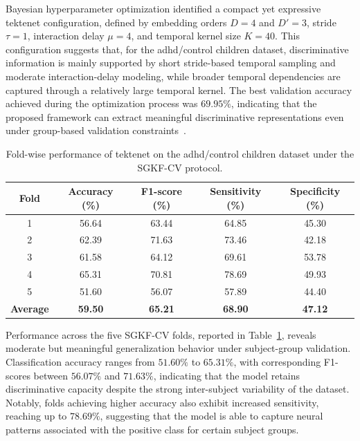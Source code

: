 Bayesian hyperparameter optimization identified a compact yet expressive \gls{tektenet} configuration, defined by embedding orders $D=4$ and $D'=3$, stride $\tau=1$, interaction delay $\mu=4$, and temporal kernel size $K=40$. This configuration suggests that, for the \gls{adhd}/control children dataset, discriminative information is mainly supported by short stride-based temporal sampling and moderate interaction-delay modeling, while broader temporal dependencies are captured through a relatively large temporal kernel. The best validation accuracy achieved during the optimization process was $69.95\%$, indicating that the proposed framework can extract meaningful discriminative representations even under group-based validation constraints~\cite{snoek2012practical}.

\begin{table}[H]
\centering
\caption{Fold-wise performance of \gls{tektenet} on the \gls{adhd}/control children dataset under the SGKF-CV protocol.}
\label{tab:tdha_folds}
\begin{tabular}{ccccc}
\toprule
\textbf{Fold} & \textbf{Accuracy (\%)} & \textbf{F1-score (\%)} & \textbf{Sensitivity (\%)} & \textbf{Specificity (\%)} \\
\midrule
1 & 56.64 & 63.44 & 64.85 & 45.30 \\
2 & 62.39 & 71.63 & 73.46 & 42.18 \\
3 & 61.58 & 64.12 & 69.61 & 53.78 \\
4 & 65.31 & 70.81 & 78.69 & 49.93 \\
5 & 51.60 & 56.07 & 57.89 & 44.40 \\
\midrule
\textbf{Average} & \textbf{59.50} & \textbf{65.21} & \textbf{68.90} & \textbf{47.12} \\
\bottomrule
\end{tabular}
\end{table}

Performance across the five SGKF-CV folds, reported in Table~\ref{tab:tdha_folds}, reveals moderate but meaningful generalization behavior under subject-group validation. Classification accuracy ranges from $51.60\%$ to $65.31\%$, with corresponding F1-scores between $56.07\%$ and $71.63\%$, indicating that the model retains discriminative capacity despite the strong inter-subject variability of the dataset. Notably, folds achieving higher accuracy also exhibit increased sensitivity, reaching up to $78.69\%$, suggesting that the model is able to capture neural patterns associated with the positive class for certain subject groups.

